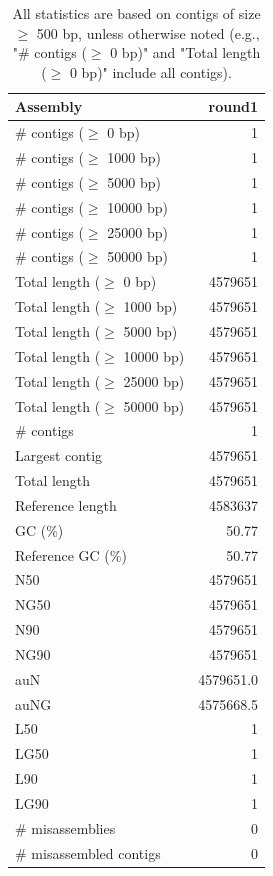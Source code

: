 \documentclass[12pt,a4paper]{article}
\begin{document}
\begin{table}[ht]
\begin{center}
\caption{All statistics are based on contigs of size $\geq$ 500 bp, unless otherwise noted (e.g., "\# contigs ($\geq$ 0 bp)" and "Total length ($\geq$ 0 bp)" include all contigs).}
\begin{tabular}{|l*{1}{|r}|}
\hline
Assembly & round1 \\ \hline
\# contigs ($\geq$ 0 bp) & 1 \\ \hline
\# contigs ($\geq$ 1000 bp) & 1 \\ \hline
\# contigs ($\geq$ 5000 bp) & 1 \\ \hline
\# contigs ($\geq$ 10000 bp) & 1 \\ \hline
\# contigs ($\geq$ 25000 bp) & 1 \\ \hline
\# contigs ($\geq$ 50000 bp) & 1 \\ \hline
Total length ($\geq$ 0 bp) & 4579651 \\ \hline
Total length ($\geq$ 1000 bp) & 4579651 \\ \hline
Total length ($\geq$ 5000 bp) & 4579651 \\ \hline
Total length ($\geq$ 10000 bp) & 4579651 \\ \hline
Total length ($\geq$ 25000 bp) & 4579651 \\ \hline
Total length ($\geq$ 50000 bp) & 4579651 \\ \hline
\# contigs & 1 \\ \hline
Largest contig & 4579651 \\ \hline
Total length & 4579651 \\ \hline
Reference length & 4583637 \\ \hline
GC (\%) & 50.77 \\ \hline
Reference GC (\%) & 50.77 \\ \hline
N50 & 4579651 \\ \hline
NG50 & 4579651 \\ \hline
N90 & 4579651 \\ \hline
NG90 & 4579651 \\ \hline
auN & 4579651.0 \\ \hline
auNG & 4575668.5 \\ \hline
L50 & 1 \\ \hline
LG50 & 1 \\ \hline
L90 & 1 \\ \hline
LG90 & 1 \\ \hline
\# misassemblies & 0 \\ \hline
\# misassembled contigs & 0 \\ \hline

\end{tabular}
\end{center}
\end{table}
\end{document}
